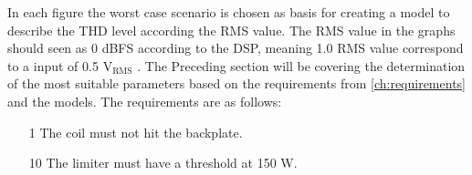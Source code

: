 In each figure the worst case scenario is chosen as basis for creating a model to describe the THD level according the RMS value. The RMS value in the graphs should seen as 0 dBFS according to the DSP, meaning 1.0 RMS value correspond to a input of 0.5 $\text{V}_\text{RMS}$ . The Preceding section will be covering the determination of the most suitable parameters based on the requirements from \autoref{ch:requirements} and the models. The requirements are as follows:

\begin{enumerate}
\item[1] The coil must not hit the backplate.
\item[10] The limiter must have a threshold at 150 W.
\end{enumerate}









%

%